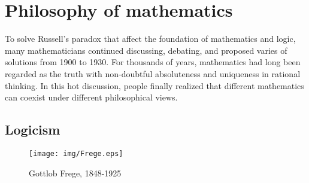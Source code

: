 \documentclass{article}
\begin{document}
\begin{Exercise}
\end{Exercise}

\section{Philosophy of mathematics}

To solve Russell's paradox that affect the foundation of mathematics and logic, many mathematicians continued discussing, debating, and proposed varies of solutions from 1900 to 1930. For thousands of years, mathematics had long been regarded as the truth with non-doubtful absoluteness and uniqueness in rational thinking. In this hot discussion, people finally realized that different mathematics can coexist under different philosophical views.

\subsection{Logicism}

\begin{wrapfigure}{L}{0.3\textwidth}
 \centering
 \texttt{[image: img/Frege.eps]}
 \captionsetup{labelformat=empty}
 \caption{Gottlob Frege, 1848-1925}
 \label{fig:Frege}
\end{wrapfigure}

\end{document}
